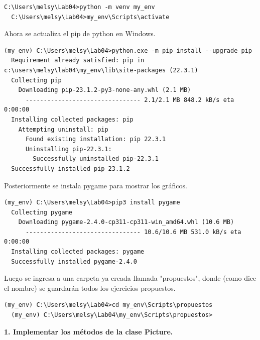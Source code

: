 \documentclass{article}
\begin{document}
  \begin{lstlisting}[style=shell]
  C:\Users\melsy\Lab04>python -m venv my_env
  C:\Users\melsy\Lab04>my_env\Scripts\activate
  \end{lstlisting}
  
  \vspace{\baselineskip}

  Ahora se actualiza el pip de python en Windows.

  \begin{lstlisting}[style=shell]
  (my_env) C:\Users\melsy\Lab04>python.exe -m pip install --upgrade pip
  Requirement already satisfied: pip in c:\users\melsy\lab04\my_env\lib\site-packages (22.3.1)
  Collecting pip
    Downloading pip-23.1.2-py3-none-any.whl (2.1 MB)
      -------------------------------- 2.1/2.1 MB 848.2 kB/s eta 0:00:00
  Installing collected packages: pip
    Attempting uninstall: pip
      Found existing installation: pip 22.3.1
      Uninstalling pip-22.3.1:
        Successfully uninstalled pip-22.3.1
  Successfully installed pip-23.1.2
  \end{lstlisting}

  \vspace{\baselineskip}

  Posteriormente se instala pygame para mostrar los gráficos.
  
  \begin{lstlisting}[style=shell]
  (my_env) C:\Users\melsy\Lab04>pip3 install pygame
  Collecting pygame
    Downloading pygame-2.4.0-cp311-cp311-win_amd64.whl (10.6 MB)
      -------------------------------- 10.6/10.6 MB 531.0 kB/s eta 0:00:00
  Installing collected packages: pygame
  Successfully installed pygame-2.4.0
  \end{lstlisting}

  \vspace{\baselineskip}

  Luego se ingresa a una carpeta ya creada llamada "propuestos", donde (como dice el nombre) se guardarán todos los ejercicios propuestos.
  
  \begin{lstlisting}[style=shell]
  (my_env) C:\Users\melsy\Lab04>cd my_env\Scripts\propuestos
  (my_env) C:\Users\melsy\Lab04\my_env\Scripts\propuestos>
  \end{lstlisting}

  \vspace{2\baselineskip}

  \textbf{1. Implementar los métodos de la clase Picture.}
\end{document}
